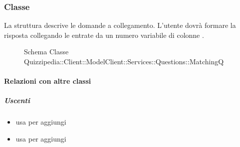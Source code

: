 \subsubsection{Classe }
La struttura descrive le domande a collegamento. L'utente dovrà formare la risposta collegando le entrate da un numero variabile di colonne .
\begin{figure}[H]
\centering
\noindent{}
\caption[Schema Classe MatchingQ]{Schema Classe Quizzipedia::Client::ModelClient::Services::Questions::MatchingQ}
\end{figure}
\paragraph{Relazioni con altre classi}
\subparagraph{Uscenti}
\begin{itemize}
\item usa  per aggiungi
\item usa  per aggiungi
\end{itemize}
